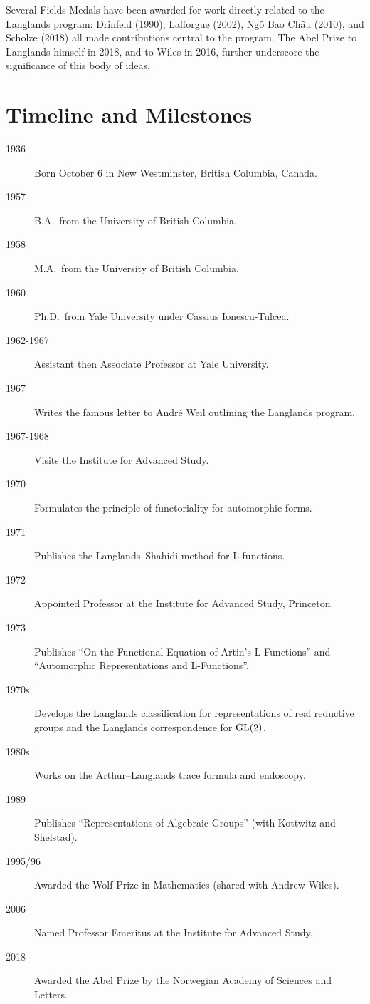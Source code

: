 Several Fields Medals have been awarded for work directly related to the Langlands program: Drinfeld (1990), Lafforgue (2002), Ng\^{o} Bao Ch\^{a}u (2010), and Scholze (2018) all made contributions central to the program. The Abel Prize to Langlands himself in 2018, and to Wiles in 2016, further underscore the significance of this body of ideas.

\section{Timeline and Milestones}

\begin{description}
\item[1936] Born October 6 in New Westminster, British Columbia, Canada.
\item[1957] B.A.\ from the University of British Columbia.
\item[1958] M.A.\ from the University of British Columbia.
\item[1960] Ph.D.\ from Yale University under Cassius Ionescu-Tulcea.
\item[1962-1967] Assistant then Associate Professor at Yale University.
\item[1967] Writes the famous letter to Andr\'{e} Weil outlining the Langlands program.
\item[1967-1968] Visits the Institute for Advanced Study.
\item[1970] Formulates the principle of functoriality for automorphic forms.
\item[1971] Publishes the Langlands--Shahidi method for L-functions.
\item[1972] Appointed Professor at the Institute for Advanced Study, Princeton.
\item[1973] Publishes ``On the Functional Equation of Artin's L-Functions'' and ``Automorphic Representations and L-Functions''.
\item[1970s] Develops the Langlands classification for representations of real reductive groups and the Langlands correspondence for \(\operatorname{GL}(2)\).
\item[1980s] Works on the Arthur--Langlands trace formula and endoscopy.
\item[1989] Publishes ``Representations of Algebraic Groups'' (with Kottwitz and Shelstad).
\item[1995/96] Awarded the Wolf Prize in Mathematics (shared with Andrew Wiles).
\item[2006] Named Professor Emeritus at the Institute for Advanced Study.
\item[2018] Awarded the Abel Prize by the Norwegian Academy of Sciences and Letters.
\end{description}

